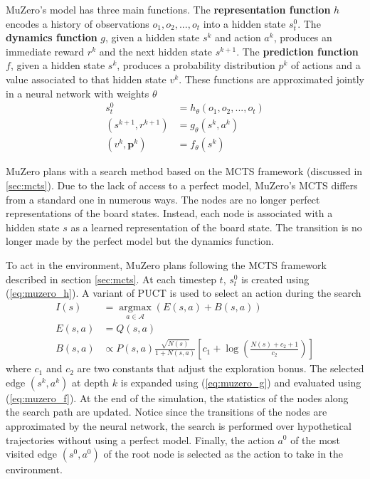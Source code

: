 \documentclass[12pt]{article}
\newcommand{\argmax}[1]{\operatorname*{argmax}_{#1}}
\begin{document}
MuZero's model has three main functions.
The \textbf{representation function} $h$ encodes a history of observations $o_1, o_2, ..., o_t$ into a hidden state $s_t^0$.
The \textbf{dynamics function} $g$,
given a hidden state $s^k$ and action $a^k$, produces an immediate reward $r^k$ and the next hidden state $s^{k+1}$.
The \textbf{prediction function} $f$,
given a hidden state $s^k$, produces a probability distribution $p^k$ of actions and a value associated to that hidden state $v^k$.
These functions are approximated jointly in a neural network with weights $\theta$
\begin{align}
    s^0_t               & = h_{\theta}(o_1, o_2, ..., o_t) \label{eq:muzero_h}  \\
    (s^{k+1}, r^{k+1})  & = g_{\theta}(s^k, a^k)  \label{eq:muzero_g}  \\
    (v^k, \pmb{p}^k)    & = f_{\theta}(s^k) \label{eq:muzero_f}
\end{align}

MuZero plans with a search method based on the MCTS framework (discussed in \ref{sec:mcts}).
Due to the lack of access to a perfect model, MuZero's MCTS differs from a standard one in numerous ways.
The nodes are no longer perfect representations of the board states.
Instead, each node is associated with a hidden state $s$ as a learned representation of the board state.
The transition is no longer made by the perfect model but the dynamics function.

To act in the environment, MuZero plans following the MCTS framework described in section \ref{sec:mcts}.
At each timestep $t$, $s^0_t$ is created using (\ref{eq:muzero_h}).
A variant of PUCT is used to select an action during the search
\begin{align*}
    I(s)     & = \argmax{a \in \mathcal{A}} \left( E(s, a) + B(s, a) \right)  \\
    E(s, a)  & = Q(s, a)  \\
    B(s, a)  & \propto P(s, a) \frac{\sqrt{N(s)}}{1+N(s, a)}\left[c_{1}+\log \left(\frac{N(s)+c_{2}+1}{c_{2}}\right)\right]
\end{align*}
where $c_1$ and $c_2$ are two constants that adjust the exploration bonus.
The selected edge $(s^k, a^k)$ at depth $k$ is expanded using (\ref{eq:muzero_g}) and evaluated using (\ref{eq:muzero_f}).
At the end of the simulation, the statistics of the nodes along the search path are updated.
Notice since the transitions of the nodes are approximated by the neural network, the search is performed over hypothetical trajectories without using a perfect model.
Finally, the action $a^0$ of the most visited edge $(s^0, a^0)$ of the root node is selected as the action to take in the environment.
\end{document}
